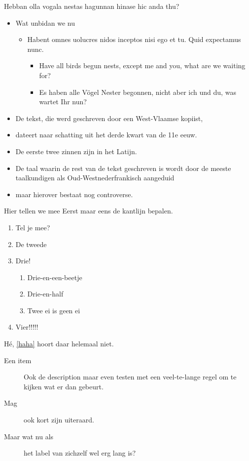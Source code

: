\documentclass[showdate=true, slidenumbers=slide]{beamerruhuisstijl169}
\begin{document}
\begin{frame}{Hebban olla vogala nestas hagunnan hinase hic anda thu?}
    \begin{itemize}
        \item Wat unbidan we nu
        \begin{itemize}
            \item Habent omnes uolucres nidos inceptos nisi ego et tu. Quid expectamus nunc.
            \begin{itemize}
                \item Have all birds begun nests, except me and you, what are we waiting for?
                \item Es haben alle V\"ogel Nester begonnen, nicht aber ich und du, was wartet Ihr nun?
            \end{itemize}
        \end{itemize}
        \item De tekst, die werd geschreven door een West-Vlaamse kopiist,
        \item dateert naar schatting uit het derde kwart van de 11e eeuw.
        \item  De eerste twee zinnen zijn in het Latijn.
        \item De taal waarin de rest van de tekst geschreven is wordt door de meeste taalkundigen als Oud-Westnederfrankisch aangeduid
        \item maar hierover bestaat nog controverse.
    \end{itemize}
\end{frame}

\begin{frame}{Hier tellen we mee}
    Eerst maar eens de kantlijn bepalen.
    \begin{enumerate}
        \item Tel je mee?
        \item De tweede
        \item Drie!
        \begin{enumerate}
            \item Drie-en-een-beetje
            \item Drie-en-half
            \item \label{haha} Twee ei is geen ei
        \end{enumerate}
        \item Vier!!!!!
    \end{enumerate}

    H\'e, \ref{haha} hoort daar helemaal niet.

    \begin{description}
        \item[Een item] Ook de description maar even testen met een veel-te-lange regel om te kijken wat er dan gebeurt.
        \item[Mag] ook kort zijn uiteraard.
        \item[Maar wat nu als] het label van zichzelf wel erg lang is?
    \end{description}
\end{frame}
\end{document}

